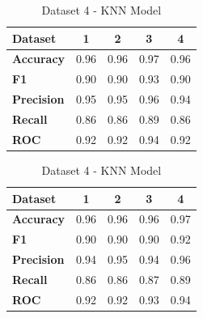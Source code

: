 \begin{table}[H]
\begin{subtable}[H]{0.45\textwidth}
\begin{tabular}{|l|c|c|c|c|}
      \hline
      \textbf{Dataset}   & \textbf{1} & \textbf{2} & \textbf{3} & \textbf{4} \\
      \hline
      \textbf{Accuracy}  & 0.96       & 0.96       & 0.97       & 0.96       \\
      \textbf{F1}        & 0.90       & 0.90       & 0.93       & 0.90       \\
      \textbf{Precision} & 0.95       & 0.95       & 0.96       & 0.94       \\
      \textbf{Recall}    & 0.86       & 0.86       & 0.89       & 0.86       \\
      \textbf{ROC}       & 0.92       & 0.92       & 0.94       & 0.92       \\
      \hline
    \end{tabular}
    \caption{Dataset 3 - KNN Model}\label{subtab:dataset_3_knn_model}
  \end{subtable}
  \quad
  \begin{subtable}[H]{0.45\textwidth}
    \centering
    \begin{tabular}{|l|c|c|c|c|}
      \hline
      \textbf{Dataset}   & \textbf{1} & \textbf{2} & \textbf{3} & \textbf{4} \\
      \hline
      \textbf{Accuracy}  & 0.96       & 0.96       & 0.96       & 0.97       \\
      \textbf{F1}        & 0.90       & 0.90       & 0.90       & 0.92       \\
      \textbf{Precision} & 0.94       & 0.95       & 0.94       & 0.96       \\
      \textbf{Recall}    & 0.86       & 0.86       & 0.87       & 0.89       \\
      \textbf{ROC}       & 0.92       & 0.92       & 0.93       & 0.94       \\
      \hline
    \end{tabular}
    \caption{Dataset 4 - KNN Model}\label{subtab:dataset_4_knn_model}
  \end{subtable}
\end{table}

